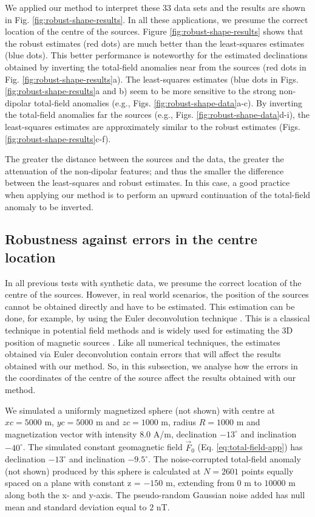 \documentclass[journal abbreviation, npg]{copernicus}
\begin{document}
We applied our method to interpret these 33 data sets and the results are shown in Fig. \ref{fig:robust-shape-results}. In all these applications, we presume the correct location of the centre of the sources. Figure \ref{fig:robust-shape-results} shows that the robust estimates (red dots) are much better than the least-squares estimates (blue dots). This better performance is noteworthy for the estimated declinations obtained by inverting the total-field anomalies near from the sources (red dots in Fig. \ref{fig:robust-shape-results}a). The least-squares estimates (blue dots in Figs. \ref{fig:robust-shape-results}a and b) seem to be more sensitive to the strong non-dipolar total-field anomalies (e.g., Figs. \ref{fig:robust-shape-data}a-c). By inverting the total-field anomalies far the sources (e.g., Figs. \ref{fig:robust-shape-data}d-i), the least-squares estimates are approximately similar to the robust estimates (Figs. \ref{fig:robust-shape-results}c-f).

The greater the distance between the sources and the data, the greater the attenuation of the non-dipolar features; and thus the smaller the difference between the least-squares and robust estimates. In this case, a good practice when applying our method is to perform an upward continuation of the total-field anomaly to be inverted.

\subsection{Robustness against errors in the centre location}

In all previous tests with synthetic data, we presume the correct location of the centre of the sources. However, in real world scenarios, the position of the sources cannot be obtained directly and have to be estimated. This estimation can be done, for example, by using the Euler deconvolution technique \citet{thompson1982, reid-etal1990}. This is a classical technique in potential field methods and is widely used for estimating the 3D position of magnetic sources \citep{reid-etal2014, uieda-etal2014}. Like all numerical techniques, the estimates obtained via Euler deconvolution contain errors that will affect the results obtained with our method. So, in this subsection, we analyse how the errors in the coordinates of the centre of the source affect the results obtained with our method.

We simulated a uniformly magnetized sphere (not shown) with centre at $xc = 5000$ m, $yc = 5000$ m and $zc = 1000$ m, radius $R = 1000$ m and magnetization vector with intensity $8.0$ A/m, declination $-13^{\circ}$ and inclination $-40^{\circ}$. The simulated constant geomagnetic field $\vec{F}_{0}$ (Eq. \ref{eq:total-field-app}) has declination $-13^{\circ}$ and inclination $-9.5^{\circ}$. The noise-corrupted total-field anomaly (not shown) produced by this sphere is calculated at $N = 2601$ points equally spaced on a plane with constant z = $-150$ m, extending from $0$ m to $10000$ m along both the x- and y-axis. The pseudo-random Gaussian noise added has null mean and standard deviation equal to $2$ nT. 
\end{document}
